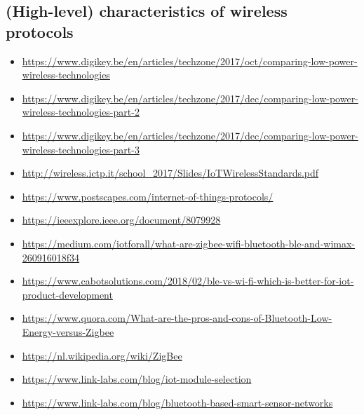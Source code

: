 \documentclass[11pt,a4paper,twoside]{article} %
\begin{document}
\subsection{(High-level) characteristics of wireless protocols}

{
	\footnotesize
	\begin{itemize}
		\itemsep0em
		\item \url{https://www.digikey.be/en/articles/techzone/2017/oct/comparing-low-power-wireless-technologies}
		\item \url{https://www.digikey.be/en/articles/techzone/2017/dec/comparing-low-power-wireless-technologies-part-2}
		\item \url{https://www.digikey.be/en/articles/techzone/2017/dec/comparing-low-power-wireless-technologies-part-3}
		\item \url{http://wireless.ictp.it/school_2017/Slides/IoTWirelessStandards.pdf}
		\item \url{https://www.postscapes.com/internet-of-things-protocols/}
		\item \url{https://ieeexplore.ieee.org/document/8079928}\\
	
		\item \url{https://medium.com/iotforall/what-are-zigbee-wifi-bluetooth-ble-and-wimax-260916018f34}
		\item \url{https://www.cabotsolutions.com/2018/02/ble-vs-wi-fi-which-is-better-for-iot-product-development}
		\item \url{https://www.quora.com/What-are-the-pros-and-cons-of-Bluetooth-Low-Energy-versus-Zigbee}
		\item \url{https://nl.wikipedia.org/wiki/ZigBee}
		\item \url{https://www.link-labs.com/blog/iot-module-selection}
		\item \url{https://www.link-labs.com/blog/bluetooth-based-smart-sensor-networks}\\
	

\end{itemize}}
\end{document}
